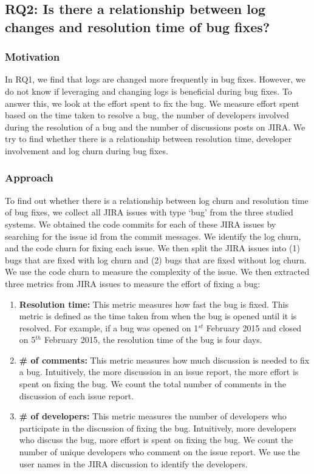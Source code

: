 \subsection*{\textbf{RQ2: Is there a relationship between log changes and resolution time of bug fixes?}}


\subsubsection*{\textbf{Motivation}}

In RQ1, we find that logs are changed more frequently in bug fixes. However, we do not know if leveraging and changing logs is beneficial during bug fixes. To answer this, we look at the  effort spent to fix the bug. We measure effort spent based on the time taken to resolve a bug, the number of developers involved during the resolution of a bug and the number of discussions posts on JIRA. We try to find whether there is a relationship between resolution time, developer involvement and log churn during bug fixes. 


\subsubsection*{\textbf{Approach}}

To find out whether there is a relationship between log churn and resolution time of bug fixes, we collect all JIRA issues with type `bug' from the three studied systems. We obtained the code commits for each of these JIRA issues by searching for the issue id from the commit messages. We identify the log churn, and the code churn for fixing each issue. We then split the JIRA issues into (1) bugs that are fixed with log churn and (2) bugs that are fixed without log churn. We use the code churn to measure the complexity of the issue. We then extracted three metrics from JIRA issues to measure the effort of fixing a bug:

\begin{enumerate}
	\item \textbf{Resolution time:} This metric measures how fast the bug is fixed. This metric is defined as the time taken from when the bug is opened until it is resolved. For example, if a bug was opened on 1$ ^{st}$ February 2015 and closed on 5$ ^{th}$ February 2015, the resolution time of the bug is four days. 
	
	\item \textbf {\# of comments:} This metric measures how much discussion is needed to fix a bug. Intuitively, the more discussion in an issue report, the more effort is spent on fixing the bug. We count the total number of comments in the discussion of each issue report.
	
	\item \textbf {\# of developers:} This metric measures the number of developers who participate in the discussion of fixing the bug. Intuitively, more developers who discuss the bug, more effort is spent on fixing the bug. We count the number of unique developers who comment on the issue report. We use the user names in the JIRA discussion to identify the developers. 
\end{enumerate}

